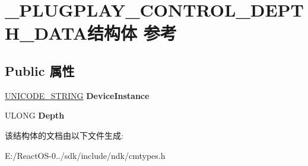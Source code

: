 \hypertarget{struct___p_l_u_g_p_l_a_y___c_o_n_t_r_o_l___d_e_p_t_h___d_a_t_a}{}\section{\+\_\+\+P\+L\+U\+G\+P\+L\+A\+Y\+\_\+\+C\+O\+N\+T\+R\+O\+L\+\_\+\+D\+E\+P\+T\+H\+\_\+\+D\+A\+T\+A结构体 参考}
\label{struct___p_l_u_g_p_l_a_y___c_o_n_t_r_o_l___d_e_p_t_h___d_a_t_a}
\subsection*{Public 属性}
\begin{DoxyCompactItemize}
\item 
\mbox{\label{struct___p_l_u_g_p_l_a_y___c_o_n_t_r_o_l___d_e_p_t_h___d_a_t_a_add71e529f53a9e36057b0e8869f59f18}} 
\hyperlink{struct___u_n_i_c_o_d_e___s_t_r_i_n_g}{U\+N\+I\+C\+O\+D\+E\+\_\+\+S\+T\+R\+I\+NG} {\bfseries Device\+Instance}
\item 
\mbox{\label{struct___p_l_u_g_p_l_a_y___c_o_n_t_r_o_l___d_e_p_t_h___d_a_t_a_af4be711859fe5b9134d3787596d49429}} 
U\+L\+O\+NG {\bfseries Depth}
\end{DoxyCompactItemize}


该结构体的文档由以下文件生成\+:\begin{DoxyCompactItemize}
\item 
E\+:/\+React\+O\+S-\/0../sdk/include/ndk/cmtypes.\+h\end{DoxyCompactItemize}
